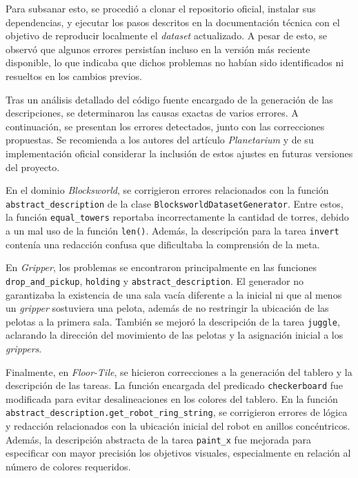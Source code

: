 Para subsanar esto, se procedió a clonar el repositorio oficial, instalar sus dependencias, y ejecutar los pasos descritos en la documentación técnica con el objetivo de reproducir localmente el \textit{dataset} actualizado. A pesar de esto, se observó que algunos errores persistían incluso en la versión más reciente disponible, lo que indicaba que dichos problemas no habían sido identificados ni resueltos en los cambios previos.

Tras un análisis detallado del código fuente encargado de la generación de las descripciones, se determinaron las causas exactas de varios errores. A continuación, se presentan los errores detectados, junto con las correcciones propuestas. Se recomienda a los autores del artículo \textit{Planetarium} y de su implementación oficial considerar la inclusión de estos ajustes en futuras versiones del proyecto.

En el dominio \textit{Blocksworld}, se corrigieron errores relacionados con la función \texttt{abstract\_description} de la clase \texttt{BlocksworldDatasetGenerator}. Entre estos, la función \texttt{equal\_towers} reportaba incorrectamente la cantidad de torres, debido a un mal uso de la función \texttt{len()}. Además, la descripción para la tarea \texttt{invert} contenía una redacción confusa que dificultaba la comprensión de la meta.

En \textit{Gripper}, los problemas se encontraron principalmente en las funciones \texttt{drop\_and\_pickup}, \texttt{holding} y \texttt{abstract\_description}. El generador no garantizaba la existencia de una sala vacía diferente a la inicial ni que al menos un \textit{gripper} sostuviera una pelota, además de no restringir la ubicación de las pelotas a la primera sala. También se mejoró la descripción de la tarea \texttt{juggle}, aclarando la dirección del movimiento de las pelotas y la asignación inicial a los \textit{grippers}.

Finalmente, en \textit{Floor-Tile}, se hicieron correcciones a la generación del tablero y la descripción de las tareas. La función encargada del predicado \texttt{checkerboard} fue modificada para evitar desalineaciones en los colores del tablero. En la función \texttt{abstract\_description.get\_robot\_ring\_string}, se corrigieron errores de lógica y redacción relacionados con la ubicación inicial del robot en anillos concéntricos. Además, la descripción abstracta de la tarea \texttt{paint\_x} fue mejorada para especificar con mayor precisión los objetivos visuales, especialmente en relación al número de colores requeridos.

